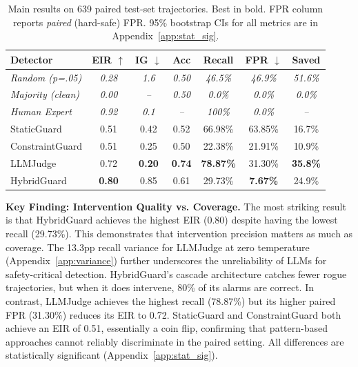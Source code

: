 \documentclass{article}
\begin{document}
\begin{table}[t]
\caption{Main results on 639 paired test-set trajectories. Best in bold. FPR column reports \emph{paired} (hard-safe) FPR. 95\% bootstrap CIs for all metrics are in Appendix~\ref{app:stat_sig}.}
\label{tab:main_results}
\vskip 0.15in
\begin{center}
\begin{small}
\begin{sc}
\begin{tabular}{lcccccc}
\toprule
Detector & EIR $\uparrow$ & IG $\downarrow$ & Acc & Recall & FPR $\downarrow$ & Saved \\
\midrule
\rowcolor[gray]{0.92} \textit{Random (p=.05)} & \textit{0.28} & \textit{1.6} & \textit{0.50} & \textit{46.5\%} & \textit{46.9\%} & \textit{51.6\%} \\
\rowcolor[gray]{0.92} \textit{Majority (clean)} & \textit{0.00} & \textit{--} & \textit{0.50} & \textit{0.0\%} & \textit{0.0\%} & \textit{0.0\%} \\
\rowcolor[gray]{0.92} \textit{Human Expert} & \textit{0.92} & \textit{0.1} & \textit{--} & \textit{100\%} & \textit{0.0\%} & \textit{--} \\
\midrule
StaticGuard & 0.51 & 0.42 & 0.52 & 66.98\% & 63.85\% & 16.7\% \\
ConstraintGuard & 0.51 & 0.25 & 0.50 & 22.38\% & 21.91\% & 10.9\% \\
LLMJudge & 0.72 & \textbf{0.20} & \textbf{0.74} & \textbf{78.87\%} & 31.30\% & \textbf{35.8\%} \\
HybridGuard & \textbf{0.80} & 0.85 & 0.61 & 29.73\% & \textbf{7.67\%} & 24.9\% \\
\bottomrule
\end{tabular}
\end{sc}
\end{small}
\end{center}
\vskip -0.1in
\end{table}

\textbf{Key Finding: Intervention Quality vs. Coverage.} The most striking result is that HybridGuard achieves the highest EIR (0.80) despite having the lowest recall (29.73\%). This demonstrates that intervention precision matters as much as coverage. The 13.3pp recall variance for LLMJudge at zero temperature (Appendix~\ref{app:variance}) further underscores the unreliability of LLMs for safety-critical detection. HybridGuard's cascade architecture catches fewer rogue trajectories, but when it does intervene, 80\% of its alarms are correct. In contrast, LLMJudge achieves the highest recall (78.87\%) but its higher paired FPR (31.30\%) reduces its EIR to 0.72. StaticGuard and ConstraintGuard both achieve an EIR of 0.51, essentially a coin flip, confirming that pattern-based approaches cannot reliably discriminate in the paired setting. All differences are statistically significant (Appendix~\ref{app:stat_sig}).
\end{document}
